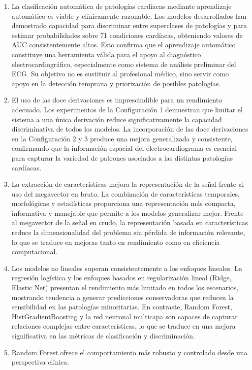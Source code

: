 \documentclass[12pt,a4paper,twoside]{book}
\begin{document}
\begin{enumerate}
	\item La clasificación automática de patologías cardíacas mediante aprendizaje automático es viable y clínicamente razonable. 
	Los modelos desarrollados han demostrado capacidad para discriminar entre superclases de patologías y para estimar probabilidades sobre 71 condiciones cardíacas, obteniendo valores de AUC consistentemente altos. 
	Esto confirma que el aprendizaje automático constituye una herramienta válida para el apoyo al diagnóstico electrocardiográfico, especialmente como sistema de análisis preliminar del ECG. Su objetivo no es sustituir al profesional médico, sino servir como apoyo en la detección temprana y priorización de posibles patologías.
	\item El uso de las doce derivaciones es imprescindible para un rendimiento adecuado. 
	Los experimentos de la Configuración 1 demuestran que limitar el sistema a una única derivación reduce significativamente la capacidad discriminativa de todos los modelos. 
	La incorporación de las doce derivaciones en la Configuración 2 y 3 produce una mejora generalizada y consistente, confirmando que la información espacial del electrocardiograma es esencial para capturar la variedad de patrones asociados a las distintas patologías cardíacas.
	\item La extracción de características mejora la representación de la señal frente al uso del megavector en bruto. 
	La combinación de características temporales, morfológicas y estadísticas proporciona una representación más compacta, informativa y manejable que permite a los modelos generalizar mejor. 
	Frente al megavector de la señal en crudo, la representación basada en características reduce la dimensionalidad del problema sin pérdida de información relevante, lo que se traduce en mejoras tanto en rendimiento como en eficiencia computacional.
	\item Los modelos no lineales superan consistentemente a los enfoques lineales. 
	La regresión logística y los enfoques basados en regularización lineal (Ridge, Elastic Net) presentan el rendimiento más limitado en todos los escenarios, mostrando tendencia a generar predicciones conservadoras que reducen la sensibilidad en las patologías minoritarias. 
	En contraste, Random Forest, HistGradientBoosting y la red neuronal multicapa son capaces de capturar relaciones complejas entre características, lo que se traduce en una mejora significativa en las métricas de clasificación y discriminación.
	\item Random Forest ofrece el comportamiento más robusto y controlado desde una perspectiva clínica. 

\end{enumerate}
\end{document}
